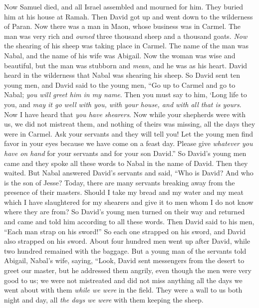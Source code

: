 \begin{biblechapter} %
 Now Samuel died, and all Israel assembled and mourned for him. They buried him at his house at Ramah. Then David got up and went down to the wilderness of Paran.
 Now there was a man in Maon, whose business was in Carmel. The man was very rich and \textit{owned} three thousand sheep and a thousand goats. \textit{Now} the shearing of his sheep was taking place in Carmel.
\verse The name of the man was Nabal, and the name of his wife was Abigail. Now the woman was wise and beautiful, but the man was stubborn and \textit{mean}, and he was as his heart.
\verse David heard in the wilderness that Nabal was shearing his sheep.
\verse So David sent ten young men, and David said to the young men, “Go up to Carmel and go to Nabal; \textit{you will greet him in my name}.
\verse Then you must say to him, ‘Long life to you, and \textit{may it go well with you, with your house, and with all that is yours}.
\verse Now I have heard that \textit{you have shearers}. Now while your shepherds were with us, we did not mistreat them, and nothing of theirs was missing, all the days they were in Carmel.
\verse Ask your servants and they will tell you! Let the young men find favor in your eyes because we have come on a feast day. Please give \textit{whatever you have on hand} for your servants and for your son David.”
\verse So David’s young men came and they spoke all these words to Nabal in the name of David. Then they waited.
\verse But Nabal answered David’s servants and said, “Who is David? And who is the son of Jesse? Today, there are many servants breaking away from the presence of their masters.
\verse Should I take my bread and my water and my meat which I have slaughtered for my shearers and give it to men whom I do not know where they are from?
\verse So David’s young men turned on their way and returned and came and told him according to all these words.
\verse Then David said to his men, “Each man strap on his sword!” So each one strapped on his sword, and David also strapped on his sword. About four hundred men went up after David, while two hundred remained with the baggage.
\verse But a young man of the servants told Abigail, Nabal’s wife, saying, “Look, David sent messengers from the desert to greet our master, but he addressed them angrily,
\verse even though the men were very good to us; we were not mistreated and did not miss anything all the days we went about with them \textit{while we were} in the field.
\verse They were a wall to us both night and day, all \textit{the days we were} with them keeping the sheep.

\end{biblechapter}
